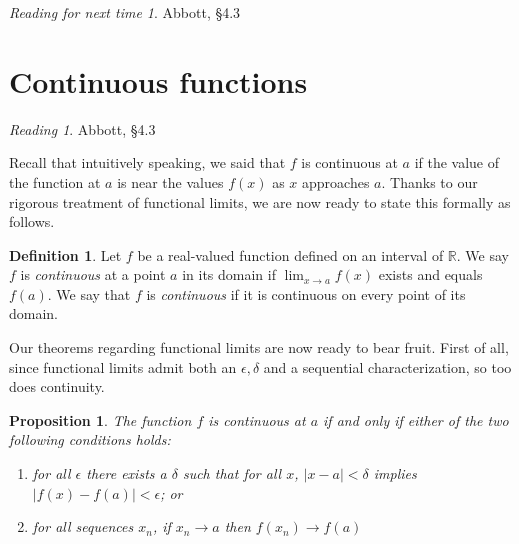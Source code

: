\documentclass[11pt,oneside]{amsbook}
\newcommand{\R}{\mathbb R}
\theoremstyle{definition}
\newtheorem{exerc}{Exercise}[section]
\theoremstyle{plain}
\newtheorem{proposition}[theorem]{Proposition}
\theoremstyle{definition}
\newtheorem{definition}[theorem]{Definition}
\theoremstyle{remark}
\newtheorem*{reading}{Reading}
\newtheorem*{readnext}{Reading for next time}
\numberwithin{equation}{section}
\numberwithin{figure}{section}
\begin{document}


\begin{readnext}
  Abbott, \S 4.3
\end{readnext}


\newpage
\section{Continuous functions}

\begin{reading}
  Abbott, \S 4.3
\end{reading}

Recall that intuitively speaking, we said that $f$ is continuous at $a$ if the value of the function at $a$ is near the values $f(x)$ as $x$ approaches $a$. Thanks to our rigorous treatment of functional limits, we are now ready to state this formally as follows.

\begin{definition}
  Let $f$ be a real-valued function defined on an interval of $\R$. We say $f$ is \emph{continuous} at a point $a$ in its domain if $\lim_{x\to a}f(x)$ exists and equals $f(a)$. We say that $f$ is \emph{continuous} if it is continuous on every point of its domain.
\end{definition}

Our theorems regarding functional limits are now ready to bear fruit. First of all, since functional limits admit both an $\epsilon,\delta$ and a sequential characterization, so too does continuity.

\begin{proposition}
  The function $f$ is continuous at $a$ if and only if either of the two following conditions holds:
  \begin{enumerate}
  \item for all $\epsilon$ there exists a $\delta$ such that for all $x$, $|x-a|<\delta$ implies $|f(x)-f(a)|<\epsilon$; or
  \item for all sequences $x_n$, if $x_n\to a$ then $f(x_n)\to f(a)$
  \end{enumerate}
\end{proposition}  
\end{document}
